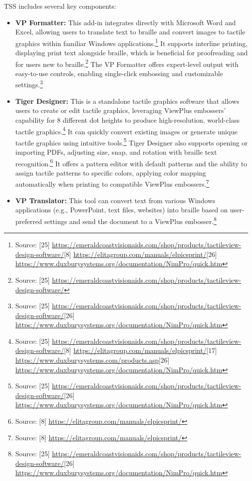 TSS includes several key components:
\begin{itemize}
    \item \textbf{VP Formatter:} This add-in integrates directly with Microsoft Word and Excel, allowing users to translate text to braille and convert images to tactile graphics within familiar Windows applications.\footnote{Source: [25] \url{https://emeraldcoastvisionaids.com/shop/products/tactileview-design-software/}[8] \url{https://elitagroup.com/manuals/elpicsprint/}[26] \url{https://www.duxburysystems.org/documentation/NimPro/quick.htm}} It supports interline printing, displaying print text alongside braille, which is beneficial for proofreading and for users new to braille.\footnote{Source: [25] \url{https://emeraldcoastvisionaids.com/shop/products/tactileview-design-software/}} The VP Formatter offers expert-level output with easy-to-use controls, enabling single-click embossing and customizable settings.\footnote{Source: [25] \url{https://emeraldcoastvisionaids.com/shop/products/tactileview-design-software/}[26] \url{https://www.duxburysystems.org/documentation/NimPro/quick.htm}}
    \item \textbf{Tiger Designer:} This is a standalone tactile graphics software that allows users to create or edit tactile graphics, leveraging ViewPlus embossers' capability for 8 different dot heights to produce high-resolution, world-class tactile graphics.\footnote{Source: [25] \url{https://emeraldcoastvisionaids.com/shop/products/tactileview-design-software/}[8] \url{https://elitagroup.com/manuals/elpicsprint/}[17] \url{https://www.duxburysystems.com/products.asp}[26] \url{https://www.duxburysystems.org/documentation/NimPro/quick.htm}} It can quickly convert existing images or generate unique tactile graphics using intuitive tools.\footnote{Source: [25] \url{https://emeraldcoastvisionaids.com/shop/products/tactileview-design-software/}[26] \url{https://www.duxburysystems.org/documentation/NimPro/quick.htm}} Tiger Designer also supports opening or importing PDFs, adjusting size, snap, and rotation with braille text recognition.\footnote{Source: [8] \url{https://elitagroup.com/manuals/elpicsprint/}} It offers a pattern editor with default patterns and the ability to assign tactile patterns to specific colors, applying color mapping automatically when printing to compatible ViewPlus embossers.\footnote{Source: [8] \url{https://elitagroup.com/manuals/elpicsprint/}}
    \item \textbf{VP Translator:} This tool can convert text from various Windows applications (e.g., PowerPoint, text files, websites) into braille based on user-preferred settings and send the document to a ViewPlus embosser.\footnote{Source: [25] \url{https://emeraldcoastvisionaids.com/shop/products/tactileview-design-software/}[26] \url{https://www.duxburysystems.org/documentation/NimPro/quick.htm}}
\end{itemize}

